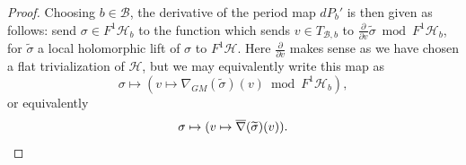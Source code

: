\begin{proof}
	Choosing $b \in \mathscr B$, the derivative of the period map $dP_b'$ is then given as follows:
	send
	$\sigma \in F^1 \mathscr H_b$ to the function which sends
	$v \in T_{\mathscr B,b}$ to $\frac{\partial }{\partial v} \widetilde{\sigma} \bmod F^1
	\mathscr H_b$,
	for $\widetilde{\sigma}$ a local holomorphic lift of $\sigma$ to $F^1
	\mathscr H$. Here $\frac{\partial }{\partial v}$ makes sense as we have
	chosen a flat trivialization of $\mathscr{H}$, but we may equivalently
	write this map as $$\sigma \mapsto (v \mapsto \nabla_{GM}(\widetilde{\sigma})(v)
	\bmod F^1\mathscr{H}_b),$$
	or equivalently
	\begin{equation*}
	\sigma \mapsto (v \mapsto
	\overline{\nabla}(\widetilde{\sigma})(v)).\qedhere
\end{equation*}
%
\end{proof}

